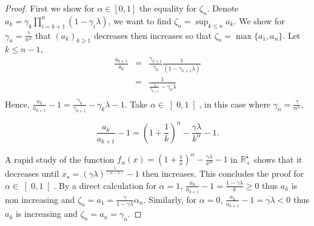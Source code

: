 \begin{proof}
First we show for $\alpha \in [0,1]$ the equality for $\zeta_n$.
Denote $a_k = \gamma_k \prod_{i=k+1}^n (1-\gamma_i\lambda)$, we want to find $\zeta_n = \sup_{k \leqslant n} a_k$. We show for $\gamma_n = \displaystyle \frac{\gamma}{n^\alpha}$ that $(a_k)_{k\geqslant 1 }$ decreases then increases so that $\zeta_n = \max\{ a_1 , a_n \}$.
Let $k \leqslant n-1$, 
\begin{eqnarray*}
\frac{a_{k+1}}{a_k}&=&\frac{\gamma_{k+1}}{\gamma_k}\frac{1}{(1-\gamma_{k+1}\lambda)}\\
&=&\frac{1}{\frac{\gamma_{k}}{\gamma_{k+1}}-\gamma_{k}\lambda}\\
\end{eqnarray*}
Hence, $\displaystyle \frac{a_{k}}{a_{k+1}} - 1 = \frac{\gamma_{k}}{\gamma_{k+1}}-\gamma_{k}\lambda-1$. Take $\alpha \in \left]0,1\right[$, in this case where $\gamma_n = \displaystyle \frac{\gamma}{n^\alpha}$, 

$$ \frac{a_{k}}{a_{k+1}} - 1 = \left(1+\frac{1}{k}\right)^\alpha - \frac{\gamma\lambda}{k^\alpha}-1 .$$

A rapid study of the function $\displaystyle f_\alpha(x) = \left(1+\frac{1}{x}\right)^\alpha - \frac{\gamma\lambda}{x^\alpha}-1$ in $\mathbb{R}_+^\star$ shows that it decreases until $x_\star = \left( \gamma \lambda\right)^{\frac{1}{(\alpha-1)}}-1$ then increases. This concludes the proof for $\alpha \in \left]0,1\right[$. By a direct calculation for $\alpha = 1$, $\displaystyle \frac{a_{k}}{a_{k+1}} - 1 = \frac{1-\gamma\lambda}{k} \geqslant 0$ thus $a_k$ is non increasing and $\zeta_n =a_1 = \displaystyle \frac{\gamma}{1-\gamma\lambda}\alpha_n$. Similarly, for $\alpha=0$, $\displaystyle \frac{a_{k}}{a_{k+1}} - 1 = \gamma\lambda < 0$ thus $a_k$ is increasing and $\zeta_n =a_n = \gamma_n$.


\end{proof}
